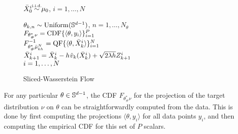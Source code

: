 \begin{wrapfigure}{R}{0.52\textwidth}
    \begin{minipage}{0.52\textwidth}
     \begin{algorithm2e} [H]
		 \SetInd{0.1ex}{1.5ex}
		 \DontPrintSemicolon
		 {\color{purple} \small {}}
		 $\bar{X}_0^i \simiid \mu_0$, \hfill $i = 1,\dots,N$ \\
     {
		    {\color{purple} \small {}}
		    $\theta_{k,n} \sim \mathrm{Uniform}(\mathbb{S}^{d-1})$, \hfill $n = 1,\dots,N_\theta$\\
        {
        {\color{purple} \small {}}
        $F_{\theta^*_\#\nu}=\textnormal{CDF}\{\langle\theta,y_i\rangle\}_{i=1}^P$\\
        {\color{purple} \small {}}
        $F^{-1}_{\theta^*_\#\bar{\mu}_{kh}^{N}}=\textnormal{QF}\{\langle\theta,\bar{X}_k^i\rangle\}_{i=1}^N$\\
        }
        {\color{purple} \small {}}
        $\bar{X}_{k+1}^i = \bar{X}_{k}^i - h \hspace{0.5pt} \hat{v}_k(\bar{X}^i_k) + \sqrt{2 \lambda h} Z^i_{k+1}$ \vspace{2pt} \\
        $\hfill i = 1,\dots,N$

		 }
		 \caption{Sliced-Wasserstein Flow}
		 \label{algo:flow}
	 \end{algorithm2e}
\end{minipage}
\vspace{-20pt}
\end{wrapfigure}

For any particular $\theta\in\mathbb{S}^{d-1}$, the CDF $F_{\theta^*_\#\nu}$ for the projection of the target distribution $\nu$ on $\theta$ can be straightforwardly computed from the data. This is done by first computing the projections $\langle \theta, y_i\rangle$ for all data points $y_i$, and then computing the empirical CDF for this set of $P$ scalars.


